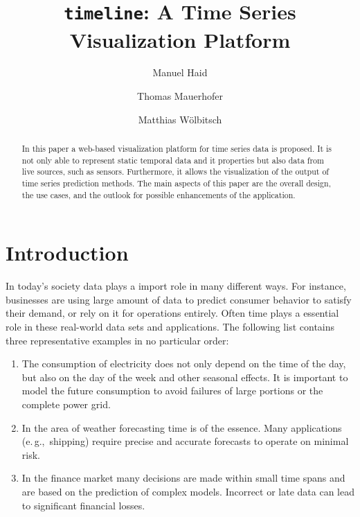 \documentclass[runningheads,a4paper,11pt]{llncs}
\newcommand{\eg}{e.\,g.,\ }
\begin{document}


\title{\texttt{timeline}: A Time Series Visualization Platform}
\author{Manuel Haid \and Thomas Mauerhofer \and Matthias W\"olbitsch}

\maketitle

\begin{abstract}
In this paper a web-based visualization platform for time series data is proposed. 
It is not only able to represent static temporal data and it properties but also data from live sources, such as sensors. 
Furthermore, it allows the visualization of the output of time series prediction methods.
The main aspects of this paper are the overall design, the use cases, and the outlook for possible enhancements of the application.
\end{abstract}



\section{Introduction}\label{sec:intro}

In today's society data plays a import role in many different ways.
For instance, businesses are using large amount of data to predict consumer behavior to satisfy their demand, or rely on it for operations entirely.
Often time plays a essential role in these real-world data sets and applications. 
The following list contains three representative examples in no particular order:

\begin{enumerate}
 \item The consumption of electricity does not only depend on the time of the day, but also on the day of the week and other seasonal effects.
 It is important to model the future consumption to avoid failures of large portions or the complete power grid.
 
 \item In the area of weather forecasting time is of the essence. 
 Many applications (\eg shipping) require precise and accurate forecasts to operate on minimal risk.
 
 \item In the finance market many decisions are made within small time spans and are based on the prediction of complex models.
 Incorrect or late data can lead to significant financial losses.
\end{enumerate}
\end{document}
